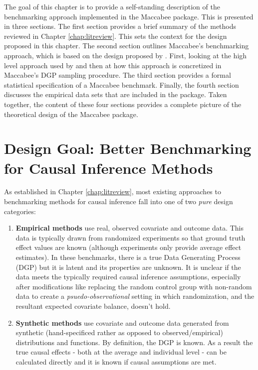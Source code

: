 \documentclass[../main.tex]{subfiles}
\begin{document}
The goal of this chapter is to provide a self-standing description of the benchmarking approach implemented in the Maccabee package. This is presented in three sections. The first section provides a brief summary of the methods reviewed in Chapter \ref{chap:litreview}. This sets the context for the design proposed in this chapter. The second section outlines Maccabee's benchmarking approach, which is based on the design proposed by \textcite{Dorie2019Automated1}. First, looking at the high level approach used by \textcite{Dorie2019Automated1} and then at how this approach is concretized in Maccabee's DGP sampling procedure. The third section provides a formal statistical specification of a Maccabee benchmark. Finally, the fourth section discusses the empirical data sets that are included in the package. Taken together, the content of these four sections provides a complete picture of the theoretical design of the Maccabee package.

\section{Design Goal: Better Benchmarking for Causal Inference Methods}
\label{mac:problems}

As established in Chapter \ref{chap:litreview}, most existing approaches to benchmarking methods for causal inference fall into one of two \textit{pure} design categories:

\begin{enumerate}
    \item \textbf{Empirical methods} use real, observed covariate and outcome data. This data is typically drawn from randomized experiments so that ground truth effect values are known (although experiments only provide average effect estimates). In these benchmarks, there is a true Data Generating Process (DGP) but it is latent and its properties are unknown. It is unclear if the data meets the typically required causal inference assumptions, especially after modifications like replacing the random control group with non-random data to create a \textit{psuedo-observational} setting in which randomization, and the resultant expected covariate balance, doesn't hold.

    \item \textbf{Synthetic methods} use covariate and outcome data generated from synthetic (hand-specificed rather as opposed to observed/empirical) distributions and functions. By definition, the DGP is known. As a result the true causal effects - both at the average and individual level - can be calculated directly and it is known if causal assumptions are met.
\end{enumerate}
\end{document}
